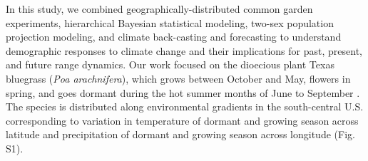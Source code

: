 \documentclass[9pt,twocolumn,twoside,lineno]{pnas-new}
\newcommand{\tom}[2]{{\color{red}{#1}}\footnote{\textit{\color{red}{#2}}}}
\begin{document}
%
In this study,  we combined geographically-distributed common garden experiments, hierarchical Bayesian statistical modeling, two-sex population projection modeling, and climate back-casting and forecasting to understand demographic responses to climate change and their implications for past, present, and future range dynamics. 
Our work focused on the dioecious plant Texas bluegrass (\textit{Poa arachnifera}), which  grows between October and May, flowers in spring, and goes dormant during the hot summer months of June to September \citep{kindiger2004interspecific}. 
The species is distributed along environmental gradients in the south-central U.S. corresponding to variation in temperature of dormant and growing season across latitude and precipitation of dormant and growing season across longitude (Fig. S1). 
\end{document}
